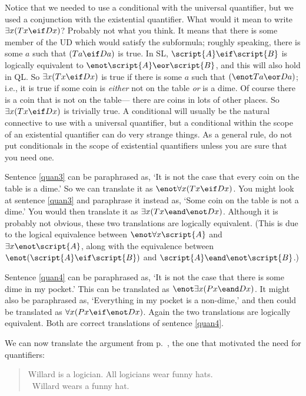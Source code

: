 Notice that we needed to use a conditional with the universal quantifier, but we used a conjunction with the existential quantifier. What would it mean to write $\exists x(Tx \eif Dx)$? Probably not what you think. It means that there is some member of the UD which would satisfy the subformula; roughly speaking, there is some $a$ such that $(Ta \eif Da)$ is true. In SL, $\script{A} \eif \script{B}$ is logically equivalent to $\enot\script{A} \eor \script{B}$, and this will also hold in QL. So $\exists x(Tx \eif Dx)$ is true if there is some $a$ such that $(\enot Ta \eor Da)$; i.e., it is true if some coin is \emph{either} not on the table \emph{or} is a dime. Of course there is a coin that is not on the table--- there are coins in lots of other places. So $\exists x(Tx \eif Dx)$ is trivially true. A conditional will usually be the natural connective to use with a universal quantifier, but a conditional within the scope of an existential quantifier can do very strange things. As a general rule, do not put conditionals in the scope of existential quantifiers unless you are sure that you need one.

Sentence \ref{quan3} can be paraphrased as, `It is not the case that every coin on the table is a dime.' So we can translate it as $\enot \forall x(Tx \eif Dx)$. You might look at sentence \ref{quan3} and paraphrase it instead as, `Some coin on the table is not a dime.' You would then translate it as $\exists x(Tx \eand \enot Dx)$. Although it is probably not obvious, these two translations are logically equivalent. (This is due to the logical equivalence between $\enot\forall x\script{A}$ and $\exists x\enot\script{A}$, along with the equivalence between $\enot(\script{A}\eif\script{B})$ and $\script{A}\eand\enot\script{B}$.)

Sentence \ref{quan4} can be paraphrased as, `It is not the case that there is some dime in my pocket.' This can be translated as $\enot\exists x(Px \eand Dx)$. It might also be paraphrased as, `Everything in my pocket is a non-dime,' and then could be translated as $\forall x(Px \eif \enot Dx)$. Again the two translations are logically equivalent. Both are correct translations of sentence \ref{quan4}.

We can now translate the argument from p.~\pageref{willard1}, the one that motivated the need for quantifiers:
\begin{quote}
Willard is a logician. All logicians wear funny hats.\\
\therefore\ Willard wears a funny hat.
\end{quote}

